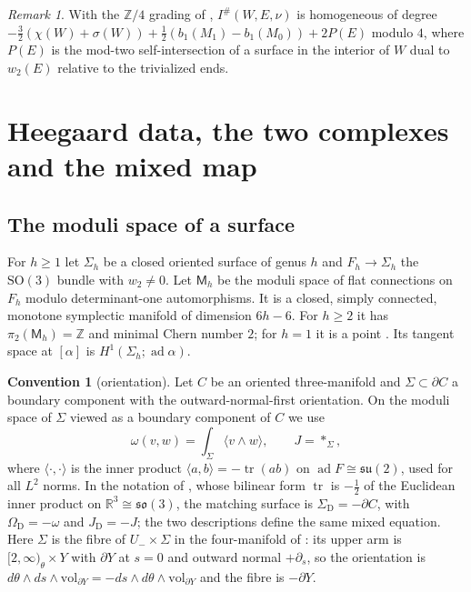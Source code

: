 \documentclass[11pt]{amsart}
\theoremstyle{definition}
\newtheorem{convention}[theorem]{Convention}
\theoremstyle{remark}
\newtheorem{remark}[theorem]{Remark}
\theoremstyle{plain}
\numberwithin{equation}{section}
\newcommand{\ZZ}{\mathbb{Z}}
\newcommand{\RR}{\mathbb{R}}
\newcommand{\ad}{\operatorname{ad}}
\newcommand{\tr}{\operatorname{tr}}
\newcommand{\SO}{\mathrm{SO}}
\newcommand{\Ish}{I^{\#}}
\newcommand{\Msf}{\mathsf{M}}
\begin{document}
\begin{remark}\label{rem:grading}
With the $\ZZ/4$ grading of \cite[Proposition~7.1]{Scaduto},
$\Ish(W,E,\nu)$ is homogeneous of degree
$-\tfrac32(\chi(W)+\sigma(W))+\tfrac12(b_1(M_1)-b_1(M_0))+2P(E)$ modulo
$4$, where $P(E)$ is the mod-two self-intersection of a surface in the
interior of $W$ dual to $w_2(E)$ relative to the trivialized ends.
\end{remark}

\section{Heegaard data, the two complexes and the mixed map}\label{sec:models}

\subsection{The moduli space of a surface}

For $h\ge1$ let $\Sigma_h$ be a closed oriented surface of genus $h$ and
$F_h\to\Sigma_h$ the $\SO(3)$ bundle with $w_2\ne0$. Let $\Msf_h$ be the
moduli space of flat connections on $F_h$ modulo determinant-one
automorphisms. It is a closed, simply connected, monotone symplectic
manifold of dimension $6h-6$. For $h\ge2$ it has
$\pi_2(\Msf_h)=\ZZ$ and minimal Chern number $2$; for $h=1$ it is
a point \cite{AB, Newstead}. Its tangent space at $[\alpha]$ is
$H^1(\Sigma_h;\ad\alpha)$.

\begin{convention}[orientation]\label{conv:orientation}
Let $C$ be an oriented three-manifold and $\Sigma\subset\partial C$ a
boundary component with the outward-normal-first orientation. On the
moduli space of $\Sigma$ viewed as a boundary component of $C$ we use
\[
\omega(v,w)=\int_\Sigma\langle v\wedge w\rangle,\qquad
J=*_\Sigma,
\]
where $\langle\cdot,\cdot\rangle$ is the inner product $\langle a,b\rangle=
-\tr(ab)$ on $\ad F\cong\mathfrak{su}(2)$, used for all $L^2$ norms. In the notation of
\cite{DFL}, whose bilinear form $\tr$ is $-\tfrac12$ of the Euclidean inner product on $\RR^3\cong\mathfrak{so}(3)$,
the matching surface is $\Sigma_{\mathrm D}=-\partial C$, with
$\Omega_{\mathrm D}=-\omega$ and $J_{\mathrm D}=-J$; the two
descriptions define the same mixed equation. Here $\Sigma$ is the fibre of
$U_-\times\Sigma$ in the four-manifold of \cite{DFL}: its upper arm is
$[2,\infty)_\theta\times Y$ with $\partial Y$ at $s=0$ and outward normal
$+\partial_s$, so the orientation is
$d\theta\wedge ds\wedge\mathrm{vol}_{\partial Y}=-ds\wedge d\theta\wedge\mathrm{vol}_{\partial Y}$
and the fibre is $-\partial Y$.
\end{convention}
\end{document}
